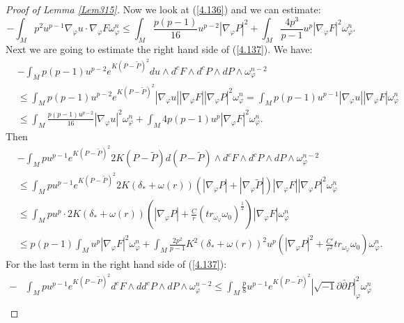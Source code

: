 \documentclass[11pt]{amsart}
\numberwithin{equation}{section}
\begin{document}
\begin{proof}[Proof of Lemma \ref{Lem315}]
Now we look at (\ref{4.136}) and we can estimate:
\begin{equation}\label{4.143}
-\int_Mp^2u^{p-1}\nabla_{\varphi}u\cdot \nabla_{\varphi}F\omega_{\varphi}^n\le \int_M\frac{p(p-1)}{16}u^{p-2}|\nabla_{\varphi}P|^2+\int_M\frac{4p^3}{p-1}u^p|\nabla_{\varphi}F|^2\omega_{\varphi}^n.
\end{equation}
Next we are going to estimate the right hand side of (\ref{4.137}).
We have:
\begin{equation*}
\begin{split}
&-\int_Mp(p-1)u^{p-2}e^{K(P-\tilde{P})^2}du\wedge d^cF\wedge d^cP\wedge dP\wedge \omega_{\varphi}^{n-2}\\
&\le \int_Mp(p-1)u^{p-2}e^{K(P-\tilde{P})^2}|\nabla_{\varphi}u||\nabla_{\varphi}F||\nabla_{\varphi}P|^2\omega_{\varphi}^n=\int_Mp(p-1)u^{p-1}|\nabla_{\varphi}u||\nabla_{\varphi}F|\omega_{\varphi}^n\\
&\le \int_M\frac{p(p-1)u^{p-2}}{16}|\nabla_{\varphi}u|^2\omega_{\varphi}^n+\int_M4p(p-1)u^p|\nabla_{\varphi}F|^2\omega_{\varphi}^n.
\end{split}
\end{equation*}
Then
\begin{equation*}
\begin{split}
&-\int_Mpu^{p-1}e^{K(P-\tilde{P})^2}2K(P-\tilde{P})d(P-\tilde{P})\wedge d^cF\wedge d^cP\wedge dP\wedge \omega_{\varphi}^{n-2}\\
&\le \int_Mpu^{p-1}e^{K(P-\tilde{P})^2}2K(\delta_*+\omega(r))(|\nabla_{\varphi}P|+|\nabla_{\varphi}\tilde{P}|)|\nabla_{\varphi}F||\nabla_{\varphi}P|^2\omega_{\varphi}^n\\
&\le\int_Mpu^p\cdot 2K(\delta_*+\omega(r))(|\nabla_{\varphi}P|+\frac{C}{r}(tr_{\omega_{\varphi}}\omega_0)^{\frac{1}{2}})|\nabla_{\varphi}F|\omega_{\varphi}^n\\
&\le p(p-1)\int_Mu^p|\nabla_{\varphi}F|^2\omega_{\varphi}^n+\int_M\frac{2p^2}{p-1}K^2(\delta_*+\omega(r))^2u^p(|\nabla_{\varphi}P|^2+\frac{C'}{r^2}tr_{\omega_{\varphi}}\omega_0)\omega_{\varphi}^n.
\end{split}
\end{equation*}
For the last term in the right hand side of (\ref{4.137}):
\begin{equation*}
\begin{split}
-&\int_Mpu^{p-1}e^{K(P-\tilde{P})^2}d^cF\wedge dd^cP\wedge dP\wedge \omega_{\varphi}^{n-2}\le \int_M\frac{p}{8}u^{p-1}e^{K(P-\tilde{P})^2}|\sqrt{-1}\partial\bar{\partial}P|^2_{\varphi}\omega_{\varphi}^n\\

\end{split}
\end{equation*}
\end{proof}
\end{document}
